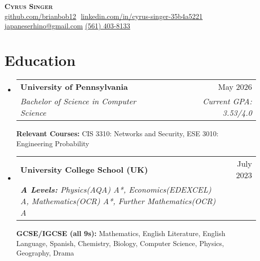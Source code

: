 \documentclass[letterpaper,11pt]{article}
\makeatletter
\newcommand{\resumeSubheading}[4]{
  \vspace{-2pt}\item
    \begin{tabular*}{0.97\textwidth}[t]{l@{\extracolsep{\fill}}r}
      \textbf{#1} & #2 \\
      \textit{\small#3} & \textit{\small #4} \\
    \end{tabular*}\vspace{-7pt}
}
\newcommand{\resumeSubHeadingListStart}{\begin{itemize}[leftmargin=0.15in, label={}]}
\newcommand{\resumeSubHeadingListEnd}{\end{itemize}}
\makeatother
\begin{document}
\hfill

\begin{center}
    \textbf{\Huge \scshape Cyrus Singer} \\ \vspace{8pt}
    \small 
    \href{https://github.com/brianbob12}{\underline{github.com/brianbob12}} $  $
    \href{https://www.linkedin.com/in/cyrus-singer-35b4a5221}{\underline{linkedin.com/in/cyrus-singer-35b4a5221}} $  $
    \href{mailto:japaneserhino@gmail.com}
    {\underline{japaneserhino@gmail.com}}
    \href{tel:561-403-8133}{\underline{(561) 403-8133}}
\end{center}

\section{Education}
  \resumeSubHeadingListStart
  
    \resumeSubheading
      {University of Pennsylvania}{May 2026}
      {Bachelor of Science in Computer Science}{Current GPA: 3.53/4.0}
      
      \vspace{5pt}

      \textbf{Relevant Courses:} CIS 3310: Networks and Security, ESE 3010: Engineering Probability\\

    \resumeSubheading
      {University College School \footnotesize{(UK)}}{July 2023} 
      {\textbf{A Levels:} \footnotesize{Physics(AQA) A*, Economics(EDEXCEL) A, Mathematics(OCR) A*, Further Mathematics(OCR) A}}{}
      \newline
      \newline
      {\textbf{GCSE/IGCSE (all 9s):} \footnotesize{Mathematics, English Literature, English Language, Spanish, Chemistry, Biology, Computer Science, Physics, Geography, Drama }}{}



  \resumeSubHeadingListEnd

\end{document}
